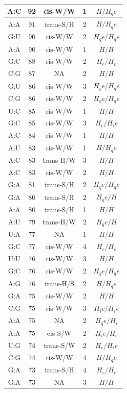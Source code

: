 \begin{center}
\begin{longtable}{c|c|c|c|c}
A:C & 92 & cis-W/W & 1 & $H/H_qe$ \\  \hline
A:A & 91 & trans-S/H & 2 & $H/H_qe$ \\  \hline
G:U & 90 & cis-W/W & 2 & $H_qe/H_qe$ \\  \hline
A:A & 90 & cis-W/W & 1 & $H/H$ \\  \hline
G:C & 88 & cis-W/W & 2 & $H_e/H_e$ \\  \hline
C:G & 87 & NA & 2 & $H/H$ \\  \hline
G:U & 86 & cis-W/W & 3 & $H_qe/H_qe$ \\  \hline
C:G & 86 & cis-W/W & 2 & $H_qe/H_qe$ \\  \hline
U:C & 85 & cis-W/W & 1 & $H/H$ \\  \hline
G:C & 85 & cis-W/W & 3 & $H_e/H_ie$ \\  \hline
A:C & 84 & cis-W/W & 1 & $H/H$ \\  \hline
A:U & 83 & cis-W/W & 1 & $H/H_qe$ \\  \hline
A:C & 83 & trans-H/W & 3 & $H/H$ \\  \hline
A:C & 83 & cis-W/W & 2 & $H/H$ \\  \hline
G:A & 81 & trans-S/H & 2 & $H_qe/H_qe$ \\  \hline
G:A & 80 & trans-S/H & 2 & $H_qe/H$ \\  \hline
A:A & 80 & trans-S/H & 1 & $H/H$ \\  \hline
A:U & 79 & trans-H/W & 2 & $H_qe/H$ \\  \hline
U:A & 77 & NA & 1 & $H/H$ \\  \hline
G:C & 77 & cis-W/W & 4 & $H_e/H_e$ \\  \hline
U:U & 76 & cis-W/W & 3 & $H/H$ \\  \hline
G:C & 76 & cis-W/W & 2 & $H_qe/H_qe$ \\  \hline
A:G & 76 & trans-H/S & 2 & $H/H_qe$ \\  \hline
G:A & 75 & cis-W/W & 2 & $H/H$ \\  \hline
C:G & 75 & cis-W/W & 3 & $H_ie/H_ie$ \\  \hline
A:A & 75 & NA & 2 & $H_qe/H_i$ \\  \hline
A:A & 75 & cis-S/W & 2 & $H_ie/H_e$ \\  \hline
U:G & 74 & trans-S/W & 2 & $H_e/H_ie$ \\  \hline
C:G & 74 & cis-W/W & 4 & $H/H_qe$ \\  \hline
G:A & 73 & trans-S/H & 4 & $H_e/H_e$ \\  \hline
G:A & 73 & NA & 3 & $H/H$ \\  \hline

\end{longtable}
\end{center}
